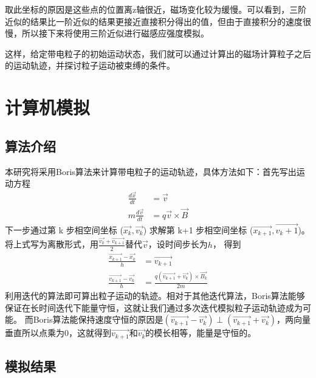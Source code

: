 \documentclass{ctexart}
\begin{document}
\par
取此坐标的原因是这些点的位置离z轴很近，磁场变化较为缓慢。可以看到，三阶近似的结果比一阶近似的结果更接近直接积分得出的值，但由于直接积分的速度很慢，所以接下来将使用三阶近似进行磁感应强度模拟。
\par
这样，给定带电粒子的初始运动状态，我们就可以通过计算出的磁场计算粒子之后的运动轨迹，并探讨粒子运动被束缚的条件。
\section{计算机模拟}
\subsection{算法介绍}
本研究将采用Boris算法\cite{Boris}来计算带电粒子的运动轨迹，具体方法如下：首先写出运动方程
\begin{align}
    \frac{d\vec{x}}{dt}&=\vec{v}\\
    m\frac{d\vec{v}}{dt}&=q\vec{v}\times \vec{B}
\end{align}
下一步通过第 k 步相空间坐标 ($\vec{x_k},\vec{v_k}$) 求解第 k+1 步相空间坐标 ($\vec{x_{k+1}},\vec{v_k+1}$)。将上式写为离散形式，用$\frac{\vec{v_{k}}+\vec{v_{k+1}}}{2}$替代$\vec{v}$，设时间步长为$h$，
得到
\begin{align}
    \frac{\vec{x_{k+1}}-\vec{x_k}}{h}&=\vec{v_{k+1}}\\
    \frac{\vec{v_{k+1}}-\vec{v_k}}{h}&=\frac{q(\vec{v_{k+1}}+\vec{v_k})\times\vec{B_k}}{2m}
\end{align}
利用迭代的算法即可算出粒子运动的轨迹。相对于其他迭代算法，Boris算法能够保证在长时间迭代下能量守恒，这就让我们通过多次迭代模拟粒子运动轨迹成为可能。
而Boris算法能保持速度守恒的原因是$(\vec{v_{k+1}}-\vec{v_k})\perp (\vec{v_{k+1}}+\vec{v_k})$，两向量垂直所以点乘为0，这就得到$\vec{v_{k+1}}$和$\vec{v_k}$的模长相等，能量是守恒的。
\subsection{模拟结果}
\end{document}
